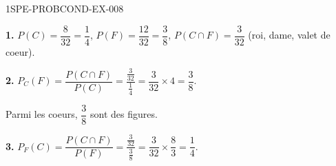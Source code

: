 \begin{corrige}{1SPE-PROBCOND-EX-008}

\textbf{1.} $P(C) = \dfrac{8}{32} = \dfrac{1}{4}$, $P(F) = \dfrac{12}{32} = \dfrac{3}{8}$, $P(C \cap F) = \dfrac{3}{32}$ (roi, dame, valet de coeur).

\medskip
\textbf{2.} $P_C(F) = \dfrac{P(C \cap F)}{P(C)} = \dfrac{\frac{3}{32}}{\frac{1}{4}} = \dfrac{3}{32} \times 4 = \dfrac{3}{8}$.

Parmi les coeurs, $\dfrac{3}{8}$ sont des figures.

\medskip
\textbf{3.} $P_F(C) = \dfrac{P(C \cap F)}{P(F)} = \dfrac{\frac{3}{32}}{\frac{3}{8}} = \dfrac{3}{32} \times \dfrac{8}{3} = \dfrac{1}{4}$.

\end{corrige}
